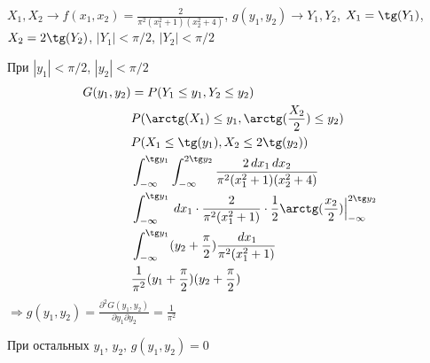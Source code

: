 \begin{exercise}[12]
	$X_1, X_2 \rightarrow f(x_1, x_2) = \frac{2}{\pi^2(x_1^2+1)(x_2^2+4)}$, $g(y_1, y_2) \rightarrow Y_1, Y_2$, $X_1 = \tg(Y_1)$, $X_2 = 2\tg(Y_2)$, $|Y_1|<\pi/2$, $|Y_2|<\pi/2$
	
	При $|y_1| < \pi/2$, $|y_2| < \pi/2$
	\begin{align*}
		G(y_1, y_2) & = P(Y_1 \leq y_1, Y_2 \leq y_2) \\
		& P(\arctg(X_1) \leq y_1, \arctg(\frac{X_2}{2}) \leq y_2) \\ & P(X_1 \leq \tg(y_1), X_2 \leq 2\tg(y_2)) \\ & \int_{-\infty}^{\tg y_1}\int_{-\infty}^{2\tg y_2}\frac{2\,dx_1\,dx_2}{\pi^2(x_1^2+1)(x_2^2+4)} \\ & \int_{-\infty}^{\tg y_1}\,dx_1\cdot \frac{2}{\pi^2(x_1^2+1)} \cdot \frac{1}{2} \arctg(\frac{x_2}{2})\Big|^{2\tg y_2}_{-\infty} \\ & \int_{-\infty}^{\tg y_1}(y_2 + \frac{\pi}{2})\frac{\,dx_1}{\pi^2(x_1^2+1)} \\ & \frac{1}{\pi^2}(y_1+\frac{\pi}{2})(y_2 + \frac{\pi}{2})
	\end{align*}
	$\Rightarrow g(y_1, y_2) = \frac{\partial^2G(y_1, y_2)}{\partial y_1 \partial y_2} = \frac{1}{\pi^2}$
	
	При остальных $y_1$, $y_2$, $g(y_1, y_2) = 0$
\end{exercise}